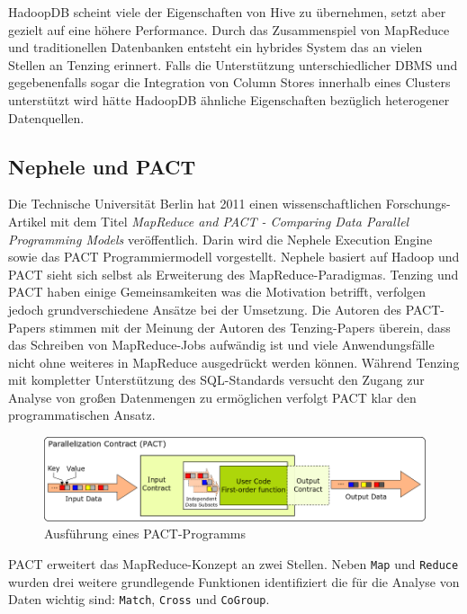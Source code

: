 \documentclass[a4paper]{article}
\begin{document}
HadoopDB scheint viele der Eigenschaften von Hive zu übernehmen, setzt aber gezielt auf eine höhere Performance. Durch das Zusammenspiel von MapReduce und traditionellen Datenbanken entsteht ein hybrides System das an vielen Stellen an Tenzing erinnert. Falls die Unterstützung unterschiedlicher DBMS und gegebenenfalls sogar die Integration von Column Stores innerhalb eines Clusters unterstützt wird hätte HadoopDB ähnliche Eigenschaften bezüglich heterogener Datenquellen.

\newpage
\subsection{Nephele und PACT}
Die Technische Universität Berlin hat 2011 einen wissenschaftlichen Forschungs-Artikel mit dem Titel \textit{MapReduce and PACT - Comparing Data Parallel Programming Models} \cite{PACT} veröffentlich. Darin wird die Nephele Execution Engine sowie das PACT Programmiermodell vorgestellt. Nephele basiert auf Hadoop und PACT sieht sich selbst als Erweiterung des MapReduce-Paradigmas. Tenzing und PACT haben einige Gemeinsamkeiten was die Motivation betrifft, verfolgen jedoch grundverschiedene Ansätze bei der Umsetzung. Die Autoren des PACT-Papers stimmen mit der Meinung der Autoren des Tenzing-Papers überein, dass das Schreiben von MapReduce-Jobs aufwändig ist und viele Anwendungsfälle nicht ohne weiteres in MapReduce ausgedrückt werden können. Während Tenzing mit kompletter Unterstützung des SQL-Standards versucht den Zugang zur Analyse von großen Datenmengen zu ermöglichen verfolgt PACT klar den programmatischen Ansatz. 

\begin{figure}[H]
	\centering
	\includegraphics[width=\textwidth]{pact.png}
	\caption{Ausführung eines PACT-Programms}
	\label{fig:pact}
\end{figure}

PACT erweitert das MapReduce-Konzept an zwei Stellen. Neben \texttt{Map} und \texttt{Reduce} wurden drei weitere grundlegende Funktionen identifiziert die für die Analyse von Daten wichtig sind: \texttt{Match}, \texttt{Cross} und \texttt{CoGroup}. 
\end{document}
